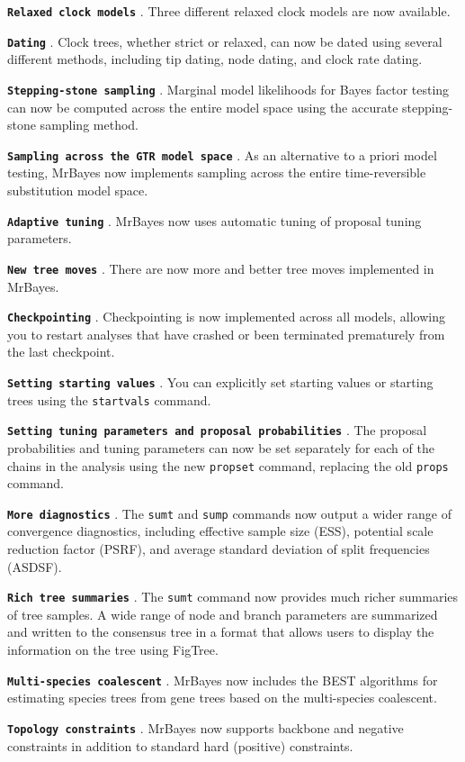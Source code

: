 \documentclass[12pt]{book}
\newcommand{\ttt}[1]{\texttt{#1} }
\newcommand{\tb}[1]{\texttt{\textbf{#1}} }
\begin{document}
\tb{Relaxed clock models}. Three different relaxed clock models are now available.

\tb{Dating}. Clock trees, whether strict or relaxed, can now be dated using several different
methods, including tip dating, node dating, and clock rate dating.

\tb{Stepping-stone sampling}. Marginal model likelihoods for Bayes factor testing can now be
computed across the entire model space using the accurate stepping-stone sampling method.

\tb{Sampling across the GTR model space}. As an alternative to a priori model testing, MrBayes
now implements sampling across the entire time-reversible substitution model space.

\tb{Adaptive tuning}. MrBayes now uses automatic tuning of proposal tuning parameters.

\tb{New tree moves}. There are now more and better tree moves implemented in MrBayes.

\tb{Checkpointing}. Checkpointing is now implemented across all models, allowing you to
restart analyses that have crashed or been terminated prematurely from the last checkpoint.

\tb{Setting starting values}. You can explicitly set starting values or starting trees using
the \ttt{startvals} command.

\tb{Setting tuning parameters and proposal probabilities}. The proposal probabilities and tuning
parameters can now be set separately for each of the chains in the analysis using the new
\ttt{propset} command, replacing the old \ttt{props} command.

\tb{More diagnostics}. The \ttt{sumt} and \ttt{sump} commands now output a wider range of
convergence diagnostics, including effective sample size (ESS), potential scale reduction
factor (PSRF), and average standard deviation of split frequencies (ASDSF).

\tb{Rich tree summaries}. The \ttt{sumt} command now provides much richer summaries of
tree samples. A wide range of node and branch parameters are summarized and written to
the consensus tree in a format that allows users to display the information on the tree using
FigTree.

\tb{Multi-species coalescent}. MrBayes now includes the BEST algorithms for estimating species
trees from gene trees based on the multi-species coalescent.

\tb{Topology constraints}. MrBayes now supports backbone and negative constraints in addition
to standard hard (positive) constraints.
\end{document}
